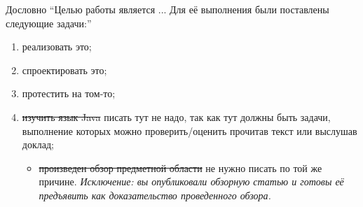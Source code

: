 
\label{sec:task}
 Дословно ``Целью работы является ... Для её выполнения были поставлены следующие задачи:''
 \begin{enumerate}
 \item  реализовать это;
 \item  спроектировать это;
 \item  протестить на том-то;
 \item \sout{изучить язык Java} писать тут не надо, так как тут должны быть задачи, выполнение которых можно проверить/оценить прочитав текст или выслушав доклад;
   \begin{itemize}
   \item \sout{произведен обзор предметной области} не нужно писать по той же причине. \emph{Исключение: вы опубликовали обзорную статью и готовы её предъявить как доказательство проведенного обзора.}
   \end{itemize}
 \end{enumerate}
